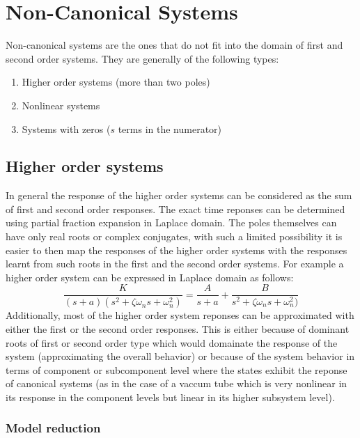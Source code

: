 \section{Non-Canonical Systems}

Non-canonical systems are the ones that do not fit into the domain of first and second order systems. They are generally of the following types:
\begin{enumerate}
	\item Higher order systems (more than two poles)
	\item Nonlinear systems
	\item Systems with zeros ($s$ terms in the numerator)
\end{enumerate}

\subsection{Higher order systems}

In general the response of the higher order systems can be considered as the sum of first and second order responses. The exact time reponses can be determined using partial fraction expansion in Laplace domain. The poles themselves can have only real roots or complex conjugates, with such a limited possibility it is easier to then map the responses of the higher order systems with the responses learnt from such roots in the first and the second order systems. For example a higher order system can be expressed in Laplace domain as follows:
\begin{equation}
	\frac{K}{(s+a) (s^2 + \zeta \omega_{n} s + \omega_{n}^2)} = \frac{A}{s+a} + \frac{B}{s^2 + \zeta \omega_{n} s + \omega_{n}^2)}
\end{equation}
Additionally, most of the higher order system reponses can be approximated with either the first or the second order responses. This is either because of dominant roots of first or second order type which would domainate the response of the system (approximating the overall behavior) or because of the system behavior in terms of component or subcomponent level where the states exhibit the reponse of canonical systems (as in the case of a vaccum tube which is very nonlinear in its response in the component levels but linear in its higher subsystem level).

\subsubsection{Model reduction}

